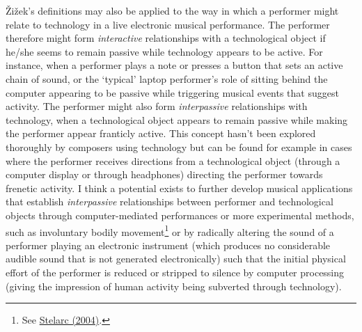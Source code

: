 \v{Z}i\v{z}ek's definitions may also be applied to the way in which a performer might relate to technology in a live electronic musical performance. The performer therefore might form \emph{interactive} relationships with a technological object if he/she seems to remain passive while technology appears to be active. For instance, when a performer plays a note or presses a button that sets an active chain of sound, or the `typical' laptop performer's role of sitting behind the computer appearing to be passive while triggering musical events that suggest activity. The performer might also form \emph{interpassive} relationships with technology, when a technological object appears to remain passive while making the performer appear franticly active. This concept hasn't been explored thoroughly by composers using technology but can be found for example in cases where the performer receives directions from a technological object (through a computer display or through headphones) directing the performer towards frenetic activity. I think a potential exists to further develop musical applications that establish \emph{interpassive} relationships between performer and technological objects through computer-mediated performances or more experimental methods, such as involuntary bodily movement\footnote{See \hyperlink{stelarc}{Stelarc (2004)}.} or by radically altering the sound of a performer playing an electronic instrument (which produces no considerable audible sound that is not generated electronically) such that the initial physical effort of the performer is reduced or stripped to silence by computer processing (giving the impression of human activity being subverted through technology). 

